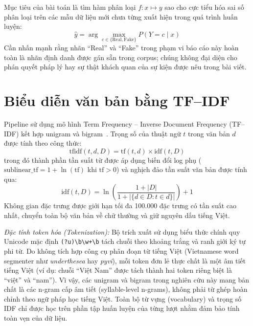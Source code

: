 \documentclass[12pt,a4paper]{report}
\begin{document}
Mục tiêu của bài toán là tìm hàm phân loại $f: x \mapsto y$ sao cho cực tiểu hóa sai số phân loại trên các mẫu dữ liệu mới chưa từng xuất hiện trong quá trình huấn luyện:
\begin{equation}
  \hat{y} = \arg\max_{c \in \{\text{Real}, \text{Fake}\}} P(Y = c \mid x)
\end{equation}
Cần nhấn mạnh rằng nhãn ``Real'' và ``Fake'' trong phạm vi báo cáo này hoàn toàn là nhãn định danh được gán sẵn trong corpus; chúng không đại diện cho phán quyết pháp lý hay sự thật khách quan của sự kiện được nêu trong bài viết.

\section{Biểu diễn văn bản bằng TF--IDF}
Pipeline sử dụng mô hình Term Frequency -- Inverse Document Frequency (TF--IDF) kết hợp unigram và bigram~\cite{scikit_tfidf}. Trọng số của thuật ngữ $t$ trong văn bản $d$ được tính theo công thức:
\begin{equation}
  \text{tfidf}(t, d, D) = \text{tf}(t, d) \times \text{idf}(t, D)
\end{equation}
trong đó thành phần tần suất từ được áp dụng biến đổi log phụ ($\text{sublinear\_tf} = 1 + \ln(\text{tf})$ khi $\text{tf} > 0$) và nghịch đảo tần suất văn bản được tính qua:
\begin{equation}
  \text{idf}(t, D) = \ln\left(\frac{1 + |D|}{1 + |\{d \in D : t \in d\}|}\right) + 1
\end{equation}
Không gian đặc trưng được giới hạn tối đa 100.000 đặc trưng có tần suất cao nhất, chuyển toàn bộ văn bản về chữ thường và giữ nguyên dấu tiếng Việt.

\textit{Đặc tính token hóa (Tokenization):} Bộ trích xuất sử dụng biểu thức chính quy Unicode mặc định \texttt{(?u)\textbackslash b\textbackslash w+\textbackslash b} tách chuỗi theo khoảng trắng và ranh giới ký tự phi từ. Do không tích hợp công cụ phân đoạn từ tiếng Việt (Vietnamese word segmenter như \textit{underthesea} hay \textit{pyvi}), mỗi token đơn lẻ thực chất là một âm tiết tiếng Việt (ví dụ: chuỗi ``Việt Nam'' được tách thành hai token riêng biệt là ``việt'' và ``nam''). Vì vậy, các unigram và bigram trong nghiên cứu này mang bản chất là các n-gram cấp âm tiết (syllable-level n-grams), không phải từ ghép hoàn chỉnh theo ngữ pháp học tiếng Việt. Toàn bộ từ vựng (vocabulary) và trọng số IDF chỉ được học trên phần tập huấn luyện của từng lượt nhằm đảm bảo tính toàn vẹn của dữ liệu.
\end{document}
